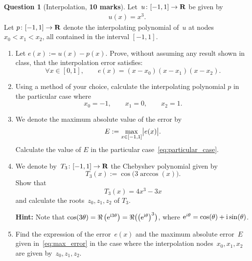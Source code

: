 \documentclass[11pt]{article}
\theoremstyle{definition}
\newtheorem{question}{Question}
\theoremstyle{remark}
\theoremstyle{plain}%
\begin{document}
\newpage
\begin{question}
    [Interpolation, \textbf{10 marks}]
    Let~$u\colon [-1, 1] \to \mathbf R$ be given by
    \begin{align*}
        u(x) = x^3.
    \end{align*}
    Let $p \colon [-1, 1] \to \mathbf R$ denote the interpolating polynomial of~$u$ at nodes $x_0 < x_1 < x_2$,
    all contained in the interval $[-1, 1]$.
    \begin{enumerate}
        \itemsep0pt
        \item
            Let $e(x) := u(x) - p(x)$.
            Prove, without assuming any result shown in class,
            that the interpolation error satisfies:
            \[
                \forall x \in [0, 1], \qquad
                e(x) = (x-x_0) (x-x_1) (x-x_2).
            \]

        \item
            Using a method of your choice,
            calculate the interpolating polynomial $p$ in the particular case where
            \begin{equation}
                \label{eq:particular_case}
                x_0 = -1, \qquad x_1 = 0, \qquad x_2 = 1.
            \end{equation}

        \item {}
            We denote the maximum absolute value of the error by
            \begin{equation}
                \label{eq:max_error}
                E := \max_{x \in [-1, 1]} \abs[\big]{e(x)}.
            \end{equation}
            Calculate the value of $E$ in the particular case~\eqref{eq:particular_case}.

        \item
            We denote by~$T_3 \colon [-1, 1] \to \mathbf R$ the Chebyshev polynomial given by
            \[
                T_3(x) := \cos\bigl(3 \arccos(x)\bigr).
            \]
            Show that
            \[
                T_3(x) = 4x^3 - 3x
            \]
            and calculate the roots~$z_0, z_1, z_2$ of $T_3$.

            \textbf{Hint:} Note that $\cos (3 \theta) = \Re \left( \mathrm e^{\mathrm i 3\theta} \right) = \Re \bigl( \left(\mathrm e^{\mathrm i \theta} \right)^3 \bigr)$, where $\mathrm e^{i \theta} = \cos (\theta) + \mathrm i \sin (\theta)$.

        \item
            Find the expression of the error~$e(x)$ and the maximum absolute error~$E$ given in~\eqref{eq:max_error}
            in the case where the interpolation nodes~$x_0, x_1, x_2$ are given by~$z_0, z_1, z_2$.


\end{enumerate}
\end{question}
\end{document}
